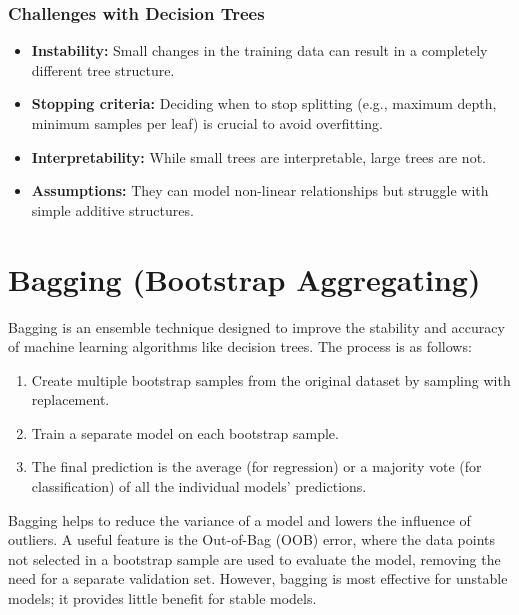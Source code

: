 \documentclass{article}
\begin{document}
\begin{multicols}{2}
	\subsubsection{Challenges with Decision Trees}
	\begin{itemize}
		\item \textbf{Instability:} Small changes in the training data can result in a completely different tree structure.
		\item \textbf{Stopping criteria:} Deciding when to stop splitting (e.g., maximum depth, minimum samples per leaf) is crucial to avoid overfitting.
		\item \textbf{Interpretability:} While small trees are interpretable, large trees are not.
		\item \textbf{Assumptions:} They can model non-linear relationships but struggle with simple additive structures.
	\end{itemize}

	\section{Bagging (Bootstrap Aggregating)}
	Bagging is an ensemble technique designed to improve the stability and accuracy of machine learning algorithms like decision trees.
	The process is as follows:
	\begin{enumerate}
		\item Create multiple bootstrap samples from the original dataset by sampling with replacement.
		\item Train a separate model on each bootstrap sample.
		\item The final prediction is the average (for regression) or a majority vote (for classification) of all the individual models' predictions.
	\end{enumerate}
	Bagging helps to reduce the variance of a model and lowers the influence of outliers. A useful feature is the Out-of-Bag (OOB) error, where the data points not selected in a bootstrap sample are used to evaluate the model, removing the need for a separate validation set. However, bagging is most effective for unstable models; it provides little benefit for stable models.


\end{multicols}
\end{document}
